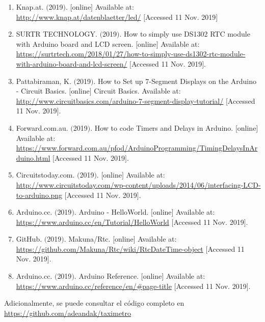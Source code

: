 \documentclass[a4paper,11pt]{article}
\begin{document}
\begin{enumerate}
	\item Knap.at. $($2019$)$. $[$online$]$ Available at: \url{http://www.knap.at/datenblaetter/led/} $[$Accessed 11 Nov. 2019$]$
	\item SURTR TECHNOLOGY. $($2019$)$. How to simply use DS1302 RTC module with Arduino board and LCD screen. $[$online$]$ Available at: \url{https://surtrtech.com/2018/01/27/how-to-simply-use-ds1302-rtc-module-with-arduino-board-and-lcd-screen/} $[$Accessed 11 Nov. 2019$]$.
	\item Pattabiraman, K. $($2019$)$. How to Set up 7-Segment Displays on the Arduino - Circuit Basics. $[$online$]$ Circuit Basics. Available at: \url{http://www.circuitbasics.com/arduino-7-segment-display-tutorial/} $[$Accessed 11 Nov. 2019$]$.
	\item Forward.com.au. $($2019$)$. How to code Timers and Delays in Arduino. $[$online$]$ Available at: \url{https://www.forward.com.au/pfod/ArduinoProgramming/TimingDelaysInArduino.html} $[$Accessed 11 Nov. 2019$]$.
	\item Circuitstoday.com. $($2019$)$. $[$online$]$ Available at: \url{http://www.circuitstoday.com/wp-content/uploads/2014/06/interfacing-LCD-to-arduino.png} $[$Accessed 11 Nov. 2019$]$.
	\item Arduino.cc. $($2019$)$. Arduino - HelloWorld. $[$online$]$ Available at: \url{https://www.arduino.cc/en/Tutorial/HelloWorld} $[$Accessed 11 Nov. 2019$]$.
	\item GitHub. $($2019$)$. Makuna/Rtc. $[$online$]$ Available at: \url{https://github.com/Makuna/Rtc/wiki/RtcDateTime-object} $[$Accessed 11 Nov. 2019$]$.
	\item Arduino.cc. $($2019$)$. Arduino Reference. $[$online$]$ Available at: \url{https://www.arduino.cc/reference/en/#page-title} $[$Accessed 11 Nov. 2019$]$.
	

\end{enumerate}
	Adicionalmente, se puede consultar el código completo en \url{https://github.com/adeandak/taximetro}
\end{document}
